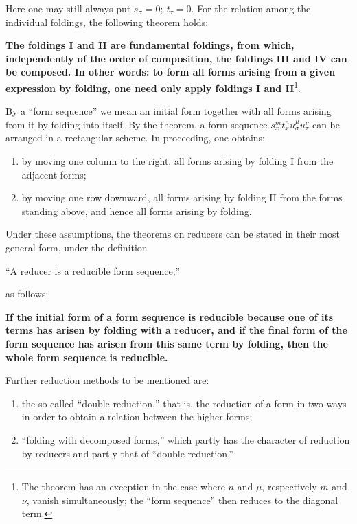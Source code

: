 \documentclass[11pt]{article}
\begin{document}
Here one may still always put $s_\sigma=0;\ t_\tau=0$. For the relation among the individual foldings, the following theorem holds:

\textbf{The foldings I and II are fundamental foldings, from which, independently of the order of composition, the foldings III and IV can be composed. In other words: to form all forms arising from a given expression by folding, one need only apply foldings I and II}\footnote{The theorem has an exception in the case where $n$ and $\mu$, respectively $m$ and $\nu$, vanish simultaneously; the ``form sequence'' then reduces to the diagonal term.}.

By a ``form sequence'' we mean an initial form together with all forms arising from it by folding into itself. By the theorem, a form sequence $s_x^m t_x^n u_\sigma^\mu u_\tau^\nu$ can be arranged in a rectangular scheme. In proceeding, one obtains:
\begin{enumerate}
\item by moving one column to the right, all forms arising by folding I from the adjacent forms;
\item by moving one row downward, all forms arising by folding II from the forms standing above, and hence all forms arising by folding.
\end{enumerate}

Under these assumptions, the theorems on reducers can be stated in their most general form, under the definition
\begin{center}
``A reducer is a reducible form sequence,''
\end{center}
as follows:

\begin{center}
\textbf{If the initial form of a form sequence is reducible because one of its terms has arisen by folding with a reducer, and if the final form of the form sequence has arisen from this same term by folding, then the whole form sequence is reducible.}
\end{center}

Further reduction methods to be mentioned are:
\begin{enumerate}
\item the so-called ``double reduction,'' that is, the reduction of a form in two ways in order to obtain a relation between the higher forms;
\item ``folding with decomposed forms,'' which partly has the character of reduction by reducers and partly that of ``double reduction.''
\end{enumerate}
\end{document}
